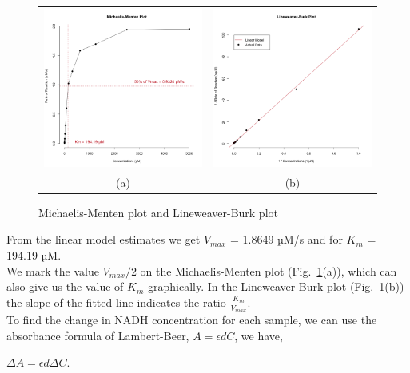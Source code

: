 \documentclass[a4paper,11pt]{article}
\begin{document}
                \begin{figure}[H]
                    \centering
                    \begin{tabular}{cc}
                        \includegraphics[width=220px]{../resources/kinetics_mmplot.png} &
                        \includegraphics[width=220px]{../resources/kinetics_lbplot.png} \\
                        (a) & (b)\\
                    \end{tabular}
                    \caption{Michaelis-Menten plot and Lineweaver-Burk plot}\label{fig:mm_plot}
                \end{figure}

                \noindent From the linear model estimates we get $V_{max}$ = 1.8649 µM/s and for $K_m$ = 194.19 µM.\\
                We mark the value $V_{max}/2$ on the Michaelis-Menten plot (Fig.~\ref{fig:mm_plot}(a)), which can
                also give us the value of $K_m$ graphically. 
                In the Lineweaver-Burk plot (Fig.~\ref{fig:mm_plot}(b)) the slope of the fitted line indicates 
                the ratio $\frac{K_m}{V_{max}}$.\\

                To find the change in NADH concentration for each sample, we can use the absorbance formula
                of Lambert-Beer, $A = \epsilon d C$, we have,
                \begin{center}
                    $\Delta A = \epsilon d \Delta C$.
                \end{center}
\end{document}
